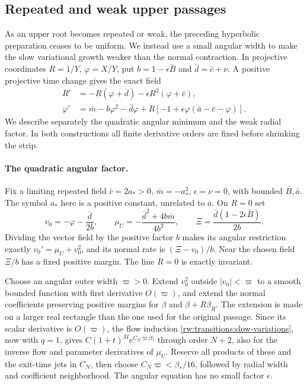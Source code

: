 \subsection{Repeated and weak upper passages}\label{rw:upper-degenerate-preparation}

As an upper root becomes repeated or weak, the preceding hyperbolic
preparation ceases to be uniform.  We instead use a small angular
width to make the slow variational growth weaker than the normal
contraction.  In projective coordinates
$R=1/Y$, $\varphi=X/Y$, put $b=1-\epsilon\bar B$ and
$\bar d=\bar c+\nu$. A positive projective time change gives the exact
field
\begin{equation}\label{rw:upper:projective}
\begin{split}
 R'&=-R(\varphi+\bar d)-\epsilon R^2(\varphi+\bar c),\\
 \varphi'&=\bar m-b\varphi^2-\bar d\varphi
       +R[-1+\epsilon\varphi(\bar a-\bar c-\varphi)].
\end{split}
\end{equation}
We describe separately the quadratic angular minimum and the weak
radial factor. In both constructions all finite derivative orders are
fixed before shrinking the strip.

\paragraph{The quadratic angular factor.}
Fix a limiting repeated field $\bar c=2a_*>0$,
$\bar m=-a_*^2$, $\epsilon=\nu=0$, with bounded $\bar B,\bar a$.
The symbol $a_*$ here is a positive constant, unrelated to $\bar a$.
On $R=0$ set
\[
 v_0=-\varphi-\frac{\bar d}{2b},\qquad
 \mu_U=-\frac{\bar d^2+4b\bar m}{4b^2},\qquad
 \Xi=\frac{\bar d(1-2\epsilon\bar B)}{2b}.
\]
Dividing the vector field by the positive factor $b$ makes its angular
restriction exactly $v_0'=\mu_U+v_0^2$, and its normal rate is
$(\Xi-v_0)/b$. Near the chosen field $\Xi/b$ has a fixed positive
margin. The line $R=0$ is exactly invariant.

Choose an angular outer width $\varpi>0$. Extend $v_0^2$ outside
$|v_0|<\varpi$ to a smooth bounded function with first derivative
$O(\varpi)$, and extend the normal coefficients preserving positive
margins for $\beta$ and $\beta+R\beta_R$. The extension is made on a
larger real rectangle than the one used for the original passage.
Since its scalar derivative is $O(\varpi)$, the flow induction
\eqref{rw:transitions:slow-variations}, now with $q=1$, gives
$C(1+t)^Me^{C_N\varpi|t|}$ through order $N+2$, also for the inverse
flow and parameter derivatives of $\mu_U$. Reserve all products of
these and the exit-time jets in $C_N$, then choose
$C_N\varpi<\beta_*/16$, followed by radial width and coefficient
neighborhood. The angular equation has no small factor $\epsilon$.


